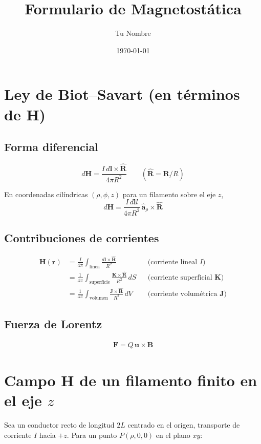 \documentclass[11pt]{article}
\title{Formulario de Magnetostática}
\author{Tu Nombre}
\date{\today}
\begin{document}
\section{Ley de Biot–Savart (en términos de \(\mathbf{H}\))}
\subsection*{Forma diferencial}
\[
d\mathbf{H}
  =\frac{I\,d\mathbf{l}\times\hat{\mathbf{R}}}{4\pi R^{2}}
\qquad
(\hat{\mathbf{R}}=\mathbf{R}/R)
\]

En coordenadas cilíndricas \(({\rho},\phi,z)\) para un filamento sobre el eje \(z\),
\[
d\mathbf{H}= \frac{I\,d\mathbf{l}l}{4\pi R^{2}}
             \,\hat{\boldsymbol{a}}_{{\rho}}
             \times\hat{\mathbf{R}}
\]

\subsection*{Contribuciones de corrientes}
\begin{align}
\mathbf{H}(\mathbf{r})
  &=\frac{I}{4\pi}\int_{\text{línea}}
      \frac{d\mathbf{l}\times\hat{\mathbf{R}}}{R^{2}}
      &&\text{(corriente lineal \(I\))}\\[6pt]
  &=\frac{1}{4\pi}\int_{\text{superficie}}
      \frac{\mathbf{K}\times\hat{\mathbf{R}}}{R^{2}}\,
      dS
      &&\text{(corriente superficial \(\mathbf{K}\))}\\[6pt]
  &=\frac{1}{4\pi}\int_{\text{volumen}}
      \frac{\mathbf{J}\times\hat{\mathbf{R}}}{R^{2}}\,
      dV
      &&\text{(corriente volumétrica \(\mathbf{J}\))}
\end{align}

\subsection*{Fuerza de Lorentz}
\begin{align}
\mathbf{F}=Q\,\mathbf{u}\times\mathbf{B}
\end{align}

\section{Campo \(\mathbf{H}\) de un filamento finito en el eje \(z\)}
Sea un conductor recto de longitud \(2L\) centrado en el origen,
transporte de corriente \(I\) hacia \(+z\).
Para un punto \(P({\rho},0,0)\) en el plano \(xy\):
\end{document}
